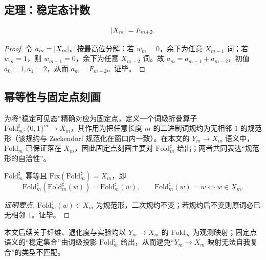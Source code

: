 \subsection{定理：稳定态计数}

\begin{theorem}\label{thm:Xm-count}
\[
\left\lvert X_m\right\rvert=F_{m+2}.
\]
\end{theorem}

\begin{proof}
令 $a_m=\left\lvert X_m\right\rvert$。按最高位分解：若 $w_m=0$，余下为任意 $X_{m-1}$ 词；若 $w_m=1$，则 $w_{m-1}=0$，余下为任意 $X_{m-2}$ 词。故 $a_m=a_{m-1}+a_{m-2}$，初值 $a_0=1,a_1=2$，从而 $a_m=F_{m+2}$。证毕。
\end{proof}

\subsection{幂等性与固定点刻画}

为将“稳定可见态”精确对应为固定点，定义一个词级折叠算子 $\mathrm{Fold}_m^\sharp:\{0,1\}^m\to X_m$，其作用为把任意长度 $m$ 的二进制词规约为无相邻 $1$ 的规范形（该规约与 Zeckendorf 规范化在窗口内一致）。在本文的 $Y_m\to X_m$ 语义中，$\mathrm{Fold}_m$ 已保证落在 $X_m$，因此固定点刻画主要对 $\mathrm{Fold}_m^\sharp$ 给出；两者共同表达“规范形的自洽性”。

\begin{theorem}\label{thm:fold-sharp-fix}
$\mathrm{Fold}_m^\sharp$ 幂等且 $\mathrm{Fix}(\mathrm{Fold}_m^\sharp)=X_m$，即
\[
\mathrm{Fold}_m^\sharp(\mathrm{Fold}_m^\sharp(w))=\mathrm{Fold}_m^\sharp(w),\qquad
\mathrm{Fold}_m^\sharp(w)=w\iff w\in X_m.
\]
\end{theorem}

\begin{proof}[证明要点]
$\mathrm{Fold}_m^\sharp(w)\in X_m$ 为规范形，二次规约不变；若规约后不变则原词必已无相邻 $1$。证毕。
\end{proof}

\begin{remark}
本文后续关于纤维、退化度与实验均以 $Y_m\to X_m$ 的 $\mathrm{Fold}_m$ 为观测映射；固定点语义的“稳定集合”由词级投影 $\mathrm{Fold}_m^\sharp$ 给出，从而避免“$Y_m\to X_m$ 映射无法自我复合”的类型不匹配。
\end{remark}

